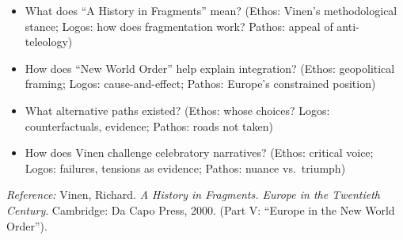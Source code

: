 \documentclass[11pt,a4paper]{article}
\begin{document}
\begin{itemize}
\item What does ``A History in Fragments'' mean? (Ethos: Vinen's methodological stance; Logos: how does fragmentation work? Pathos: appeal of anti-teleology)
\item How does ``New World Order'' help explain integration? (Ethos: geopolitical framing; Logos: cause-and-effect; Pathos: Europe's constrained position)
\item What alternative paths existed? (Ethos: whose choices? Logos: counterfactuals, evidence; Pathos: roads not taken)
\item How does Vinen challenge celebratory narratives? (Ethos: critical voice; Logos: failures, tensions as evidence; Pathos: nuance vs.\ triumph)
\end{itemize}

\vspace{1em}
\noindent\footnotesize\textit{Reference:} Vinen, Richard. \textit{A History in Fragments. Europe in the Twentieth Century}. Cambridge: Da Capo Press, 2000. (Part V: ``Europe in the New World Order'').
\end{document}
